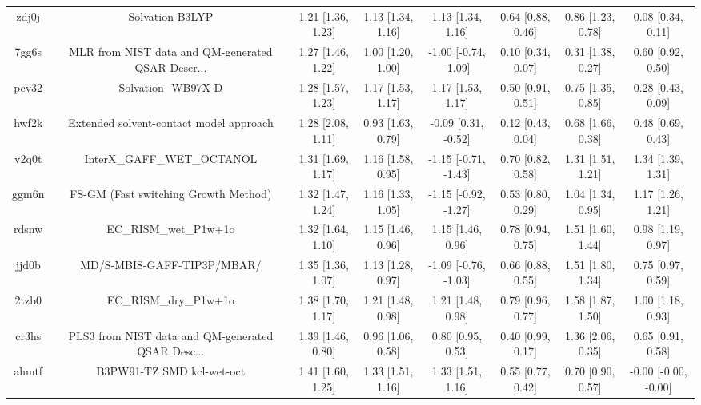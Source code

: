 \documentclass{article}
\begin{document}
\begin{center}
\begin{longtable}{|cccccccc|}
 zdj0j &                                    Solvation-B3LYP &  1.21 [1.36, 1.23] &  1.13 [1.34, 1.16] &     1.13 [1.34, 1.16] &  0.64 [0.88, 0.46] &     0.86 [1.23, 0.78] &     0.08 [0.34, 0.11] \\
 7gg6s &  MLR from NIST data and QM-generated QSAR Descr... &  1.27 [1.46, 1.22] &  1.00 [1.20, 1.00] &  -1.00 [-0.74, -1.09] &  0.10 [0.34, 0.07] &     0.31 [1.38, 0.27] &     0.60 [0.92, 0.50] \\
 pcv32 &                                 Solvation- WB97X-D &  1.28 [1.57, 1.23] &  1.17 [1.53, 1.17] &     1.17 [1.53, 1.17] &  0.50 [0.91, 0.51] &     0.75 [1.35, 0.85] &     0.28 [0.43, 0.09] \\
 hwf2k &            Extended solvent-contact model approach &  1.28 [2.08, 1.11] &  0.93 [1.63, 0.79] &   -0.09 [0.31, -0.52] &  0.12 [0.43, 0.04] &     0.68 [1.66, 0.38] &     0.48 [0.69, 0.43] \\
 v2q0t &                         InterX\_GAFF\_WET\_OCTANOL &  1.31 [1.69, 1.17] &  1.16 [1.58, 0.95] &  -1.15 [-0.71, -1.43] &  0.70 [0.82, 0.58] &     1.31 [1.51, 1.21] &     1.34 [1.39, 1.31] \\
 ggm6n &               FS-GM (Fast switching Growth Method) &  1.32 [1.47, 1.24] &  1.16 [1.33, 1.05] &  -1.15 [-0.92, -1.27] &  0.53 [0.80, 0.29] &     1.04 [1.34, 0.95] &     1.17 [1.26, 1.21] \\
 rdsnw &                              EC\_RISM\_wet\_P1w+1o &  1.32 [1.64, 1.10] &  1.15 [1.46, 0.96] &     1.15 [1.46, 0.96] &  0.78 [0.94, 0.75] &     1.51 [1.60, 1.44] &     0.98 [1.19, 0.97] \\
 jjd0b &                         MD/S-MBIS-GAFF-TIP3P/MBAR/ &  1.35 [1.36, 1.07] &  1.13 [1.28, 0.97] &  -1.09 [-0.76, -1.03] &  0.66 [0.88, 0.55] &     1.51 [1.80, 1.34] &     0.75 [0.97, 0.59] \\
 2tzb0 &                              EC\_RISM\_dry\_P1w+1o &  1.38 [1.70, 1.17] &  1.21 [1.48, 0.98] &     1.21 [1.48, 0.98] &  0.79 [0.96, 0.77] &     1.58 [1.87, 1.50] &     1.00 [1.18, 0.93] \\
 cr3hs &  PLS3 from NIST data and QM-generated QSAR Desc... &  1.39 [1.46, 0.80] &  0.96 [1.06, 0.58] &     0.80 [0.95, 0.53] &  0.40 [0.99, 0.17] &     1.36 [2.06, 0.35] &     0.65 [0.91, 0.58] \\
 ahmtf &                          B3PW91-TZ SMD kcl-wet-oct &  1.41 [1.60, 1.25] &  1.33 [1.51, 1.16] &     1.33 [1.51, 1.16] &  0.55 [0.77, 0.42] &     0.70 [0.90, 0.57] &  -0.00 [-0.00, -0.00] \\

\end{longtable}
\end{center}
\end{document}
